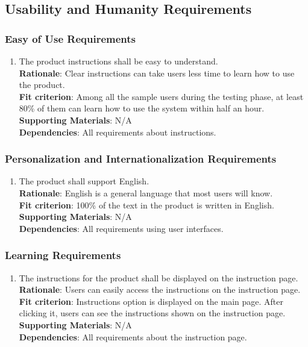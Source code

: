 \documentclass{article}
\begin{document}
\subsection{Usability and Humanity Requirements}
\subsubsection{Easy of Use Requirements}
\begin{enumerate}[UH1.1]
    \item The product instructions shall be easy to understand.\\
    \textbf{Rationale}: Clear instructions can take users less time to learn how to use the product.\\
    \textbf{Fit criterion}: Among all the sample users during the 
    testing phase, at least 80\% of them can learn how to use the system within half an hour.\\
\textbf{Supporting Materials}: N/A\\
\textbf{Dependencies}: All requirements about instructions.\\

\end{enumerate}
\subsubsection{Personalization and Internationalization Requirements}
\begin{enumerate}[UH2.1]
    \item The product shall support English.\\
    \textbf{Rationale}: English is a general language that most users will know.\\
    \textbf{Fit criterion}: 100\% of the text in the product is written in English.\\
\textbf{Supporting Materials}: N/A\\
\textbf{Dependencies}: All requirements using user interfaces.\\

\end{enumerate}
\subsubsection{Learning Requirements}
\begin{enumerate}[UH3.1]
    \item The instructions for the product shall be displayed on the instruction page.\\
    \textbf{Rationale}: Users can easily access the instructions on the instruction page.\\
    \textbf{Fit criterion}: Instructions option is displayed on the main page. After clicking it, users can see the instructions shown on the instruction page.\\
\textbf{Supporting Materials}: N/A\\
\textbf{Dependencies}: All requirements about the instruction page.\\

\end{enumerate}
\end{document}
